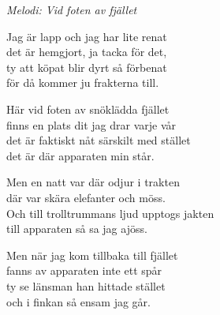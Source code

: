 {\footnotesize\textit{Melodi: Vid foten av fjället}}\par
\vspace{10pt}
Jag är lapp och jag har lite renat\\
det är hemgjort, ja tacka för det,\\
ty att köpat blir dyrt så förbenat\\
för då kommer ju frakterna till.\par
\vspace{10pt}
Här vid foten av snöklädda fjället\\
finns en plats dit jag drar varje vår\\
det är faktiskt nåt särskilt med stället\\
det är där apparaten min står.\par
\vspace{10pt}
Men en natt var där odjur i trakten\\
där var skära elefanter och möss.\\
Och till trolltrummans ljud upptogs jakten\\
till apparaten så sa jag ajöss.\par
\vspace{10pt}
Men när jag kom tillbaka till fjället\\
fanns av apparaten inte ett spår\\
ty se länsman han hittade stället\\
och i finkan så ensam jag går.
